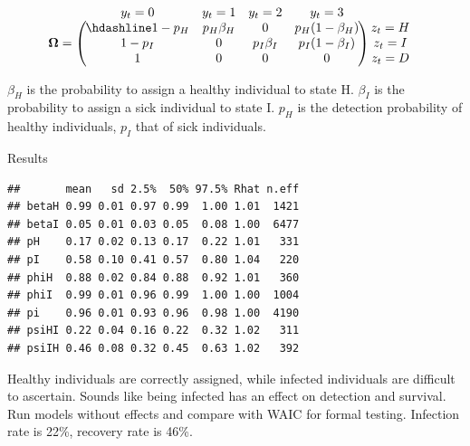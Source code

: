 \documentclass[
  12pt,
]{krantz}
\begin{document}
\[
\begin{matrix}
& \\
\mathbf{\Omega} =
    \left ( \vphantom{ \begin{matrix} 12 \\ 12 \\ 12\end{matrix} } \right .
\end{matrix}
\hspace{-1.2em}
\begin{matrix}
    y_t=0 & y_t=1 & y_t=2 & y_t=3\\ \hdashline
1-p_H & p_H \beta_H & 0 & p_H (1-\beta_H)\\
1-p_I & 0 & p_{I} \beta_{I} & p_{I} (1-\beta_{I})\\
1 & 0 & 0 & 0
\end{matrix}
\hspace{-0.2em}
\begin{matrix}
& \\
\left . \vphantom{ \begin{matrix} 12 \\ 12 \\ 12\end{matrix} } \right )
    \begin{matrix}
    z_{t}=H \\ z_{t}=I \\ z_{t}=D
    \end{matrix}
\end{matrix}
\]

\(\beta_H\) is the probability to assign a healthy individual to state H. \(\beta_{I}\) is the probability to assign a sick individual to state I. \(p_H\) is the detection probability of healthy individuals, \(p_I\) that of sick individuals.

Results

\begin{verbatim}
##       mean   sd 2.5%  50% 97.5% Rhat n.eff
## betaH 0.99 0.01 0.97 0.99  1.00 1.01  1421
## betaI 0.05 0.01 0.03 0.05  0.08 1.00  6477
## pH    0.17 0.02 0.13 0.17  0.22 1.01   331
## pI    0.58 0.10 0.41 0.57  0.80 1.04   220
## phiH  0.88 0.02 0.84 0.88  0.92 1.01   360
## phiI  0.99 0.01 0.96 0.99  1.00 1.00  1004
## pi    0.96 0.01 0.93 0.96  0.98 1.00  4190
## psiHI 0.22 0.04 0.16 0.22  0.32 1.02   311
## psiIH 0.46 0.08 0.32 0.45  0.63 1.02   392
\end{verbatim}

Healthy individuals are correctly assigned, while infected individuals are difficult to ascertain. Sounds like being infected has an effect on detection and survival. Run models without effects and compare with WAIC for formal testing. Infection rate is 22\%, recovery rate is 46\%.
\end{document}
